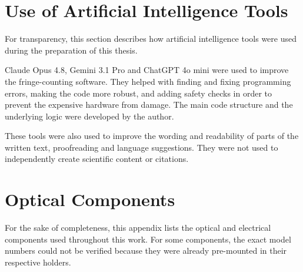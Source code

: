 \begin{appendix}
 
\chapter{Use of Artificial Intelligence Tools}
\thispagestyle{empty}

For transparency, this section describes how artificial intelligence tools were used during the preparation of this thesis.

Claude Opus 4.8, Gemini 3.1 Pro and ChatGPT 4o mini were used to improve the fringe-counting software. They helped with finding and fixing programming errors, making the code more robust, and adding safety checks in order to prevent the expensive hardware from damage. The main code structure and the underlying logic were developed by the author.

These tools were also used to improve the wording and readability of parts of the written text, proofreading and language suggestions. They were not used to independently create scientific content or citations.


\chapter{Optical Components}
\thispagestyle{empty}

For the sake of completeness, this appendix lists the optical and electrical components used throughout this work. For some components, the exact model numbers could not be verified because they were already pre-mounted in their respective holders.


\end{appendix}
